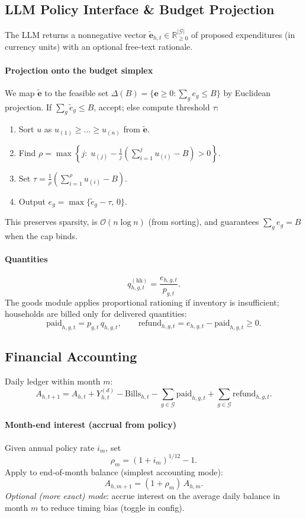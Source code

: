 \documentclass[12pt]{article}
\begin{document}
\subsection*{LLM Policy Interface \& Budget Projection}
The LLM returns a nonnegative vector $\tilde{\mathbf{e}}_{h,t}\in\mathbb{R}^{\lvert\mathcal{G}\rvert}_{\ge 0}$ of proposed expenditures (in currency units) with an optional free-text rationale.

\paragraph{Projection onto the budget simplex}
We map $\tilde{\mathbf{e}}$ to the feasible set $\Delta(B)=\{\mathbf{e}\ge 0:\sum_g e_g\le B\}$ by Euclidean projection. If $\sum_g \tilde{e}_g\le B$, accept; else compute threshold $\tau$:
\begin{enumerate}
  \item Sort $u$ as $u_{(1)}\ge\dots\ge u_{(n)}$ from $\tilde{\mathbf{e}}$.
  \item Find $\rho=\max\left\{j:\; u_{(j)}-\frac{1}{j}\left(\sum_{i=1}^j u_{(i)}-B\right)>0\right\}$.
  \item Set $\tau=\frac{1}{\rho}\left(\sum_{i=1}^\rho u_{(i)}-B\right)$.
  \item Output $e_g=\max\{\tilde{e}_g-\tau,\,0\}$.
\end{enumerate}
This preserves sparsity, is $\mathcal{O}(n\log n)$ (from sorting), and guarantees $\sum_g e_g=B$ when the cap binds.

\paragraph{Quantities}
$$
q^{(\mathrm{hh})}_{h,g,t}=\frac{e_{h,g,t}}{p_{g,t}}.
$$
The goods module applies proportional rationing if inventory is insufficient; households are billed only for delivered quantities:
$$
\text{paid}_{h,g,t}=p_{g,t}\,q_{h,g,t},\qquad \text{refund}_{h,g,t}=e_{h,g,t}-\text{paid}_{h,g,t}\ge 0.
$$

\subsection*{Financial Accounting}
Daily ledger within month $m$:
$$
A_{h,t+1}=A_{h,t}+Y_{h,t}^{(d)}-\mathrm{Bills}_{h,t}-\sum_{g\in\mathcal{G}}\text{paid}_{h,g,t}+\sum_{g\in\mathcal{G}}\text{refund}_{h,g,t}.
$$

\paragraph{Month-end interest (accrual from policy)}
Given annual policy rate $i_m$, set
$$
\rho_m=(1+i_m)^{1/12}-1.
$$
Apply to end-of-month balance (simplest accounting mode):
$$
A_{h,m+1}=(1+\rho_m)\,A_{h,m}.
$$
\textit{Optional (more exact) mode}: accrue interest on the average daily balance in month $m$ to reduce timing bias (toggle in config).
\end{document}
